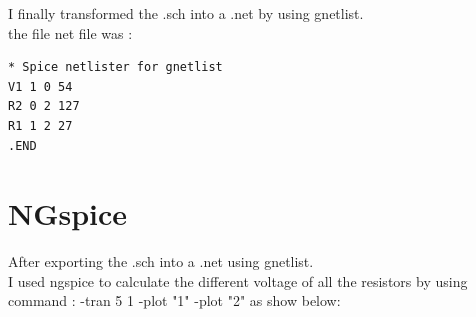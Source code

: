 \documentclass{article}
\begin{document}
I finally transformed the .sch into a .net by using gnetlist.\\

the file net file was :\\
\begin{verbatim}
* Spice netlister for gnetlist
V1 1 0 54
R2 0 2 127
R1 1 2 27
.END
\end{verbatim}

\section{NGspice}

After exporting the .sch into a .net using gnetlist.\\
I used ngspice to calculate the different voltage of all the resistors by using command :
    -tran  5 1
    -plot "1"
    -plot "2"
    as show below:
\end{document}
